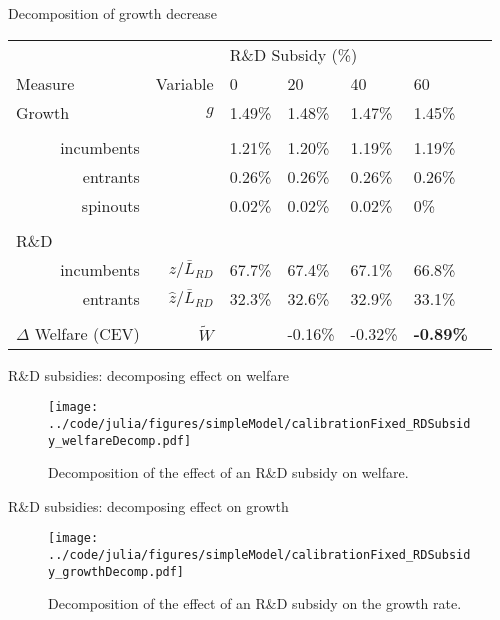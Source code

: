 \documentclass[english,usenames,dvipsnames]{beamer}
\begin{document}
\begin{frame}{Decomposition of growth decrease}\label{rd_subsidies:decomposition_growth_decrease}
	\hyperlink{RDsubsidy_table}{}
	\begin{table}
		\centering
		\small
		\begin{tabular}{lrlllll}
			\toprule \toprule
			&  & \multicolumn{4}{l}{R\&D Subsidy (\%)} \vspace{3pt} \tabularnewline
			Measure &Variable & 0 & 20 & 40 & 60 \tabularnewline
			\midrule
			Growth & $g$ & 1.49\% & 1.48\% & 1.47\% & 1.45\% \tabularnewline
			\tabularnewline
			\multicolumn{1}{r}{incumbents} & & 1.21\% & 1.20\% & 1.19\% & 1.19\% \tabularnewline
			\multicolumn{1}{r}{entrants} & & 0.26\% & 0.26\% & 0.26\% & 0.26\% \tabularnewline
			\multicolumn{1}{r}{spinouts} &  & 0.02\% & 0.02\% & 0.02\% & 0\% \tabularnewline
			\tabularnewline
			R\&D & &  &  &  & \tabularnewline
			\multicolumn{1}{r}{incumbents} & $z / \bar{L}_{RD}$ & 67.7\% & 67.4\% & 67.1\% & 66.8\% \tabularnewline
			\multicolumn{1}{r}{entrants} & $\hat{z} / \bar{L}_{RD}$ & 32.3\% & 32.6\% & 32.9\% & 33.1\% \tabularnewline
			\tabularnewline
			$\Delta$ Welfare (CEV) & $\tilde{W}$  &  & -0.16\% & -0.32\% & \alert{\textbf{-0.89\%}} \tabularnewline
			\bottomrule
		\end{tabular}
	\end{table}
\end{frame}

\begin{frame}{R\&D subsidies: decomposing effect on welfare} \label{plots:rd_subsidies1} 
	\hyperlink{RDsubsidy_table}{}
	\begin{figure}[]
		\texttt{[image: ../code/julia/figures/simpleModel/calibrationFixed\_RDSubsidy\_welfareDecomp.pdf]}
		\caption{Decomposition of the effect of an R\&D subsidy on welfare.}
		\label{calibration_RDSubsidy_welfareDecomp}
	\end{figure}
\end{frame}

\begin{frame}{R\&D subsidies: decomposing effect on growth} \label{plots:rd_subsidies2} 
	\hyperlink{RDsubsidy_table}{}
	\begin{figure}[]
		\texttt{[image: ../code/julia/figures/simpleModel/calibrationFixed\_RDSubsidy\_growthDecomp.pdf]}
		\caption{Decomposition of the effect of an R\&D subsidy on the growth rate.}
		\label{calibration_RDSubsidy_growthDecomp}
	\end{figure}
\end{frame}
\end{document}
